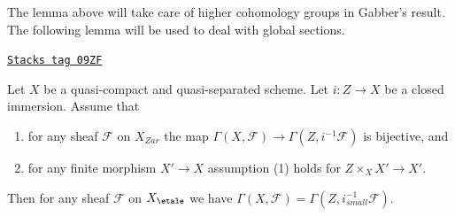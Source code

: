 The lemma above will take care of higher cohomology groups in
Gabber's result. The following lemma will be used to deal with
global sections.

\begin{lemma}[Gabber h0]
\label{etale-cohomology-lemma-gabber-h0}
\href{https://stacks.math.columbia.edu/tag/09ZF}{\texttt{Stacks tag 09ZF}}

Let $X$ be a quasi-compact and quasi-separated scheme.
Let $i : Z \to X$ be a closed immersion. Assume that
\begin{enumerate}
\item for any sheaf $\mathcal{F}$ on $X_{Zar}$ the map
$\Gamma(X, \mathcal{F}) \to \Gamma(Z, i^{-1}\mathcal{F})$
is bijective, and
\item for any finite morphism $X' \to X$ assumption (1) holds
for $Z \times_X X' \to X'$.
\end{enumerate}
Then for any sheaf $\mathcal{F}$ on $X_\etale$ we have
$\Gamma(X, \mathcal{F}) = \Gamma(Z, i^{-1}_{small}\mathcal{F})$.
\end{lemma}

